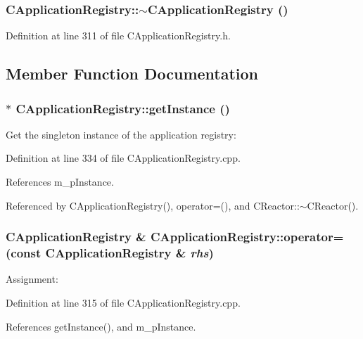 \subsubsection{\setlength{\rightskip}{0pt plus 5cm}CApplication\-Registry::$\sim$CApplication\-Registry ()\hspace{0.3cm}{\tt  [inline]}}\label{classCApplicationRegistry_a2}




Definition at line 311 of file CApplication\-Registry.h.

\subsection{Member Function Documentation}
\subsubsection{ $\ast$ CApplication\-Registry::get\-Instance ()\hspace{0.3cm}{\tt  [static]}}\label{classCApplicationRegistry_d0}


Get the singleton instance of the application registry: 

Definition at line 334 of file CApplication\-Registry.cpp.

References m\_\-p\-Instance.

Referenced by CApplication\-Registry(), operator=(), and CReactor::$\sim$CReactor().
\subsubsection{\setlength{\rightskip}{0pt plus 5cm}CApplication\-Registry \& CApplication\-Registry::operator= (const CApplication\-Registry \& {\em rhs})}\label{classCApplicationRegistry_a3}


Assignment: 

Definition at line 315 of file CApplication\-Registry.cpp.

References get\-Instance(), and m\_\-p\-Instance.
